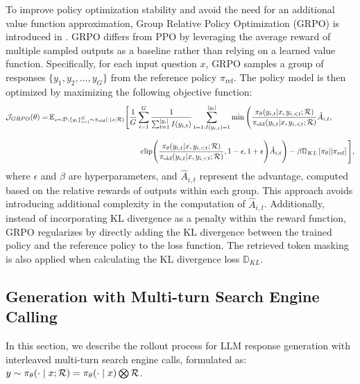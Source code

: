 To improve policy optimization stability and avoid the need for an additional value function approximation, Group Relative Policy Optimization (GRPO) is introduced in \cite{shao2024deepseekmath}. GRPO differs from PPO by leveraging the average reward of multiple sampled outputs as a baseline rather than relying on a learned value function. Specifically, for each input question \( x \), GRPO samples a group of responses \( \{ y_1, y_2, \dots, y_G \} \) from the reference policy \( \pi_{\text{ref}} \). The policy model is then optimized by maximizing the following objective function:
{\scriptsize
\begin{align}\label{eq:grpo}
\mathcal{J}_{GRPO}(\theta) = \, & 
\mathbb{E}_{x \sim \mathcal{D}, \{ y_i \}_{i=1}^{G} \sim \pi_{\text{old}}( \cdot| x; \se)}
\Bigg[
\frac{1}{G} \sum_{i=1}^{G} \frac{1}{\sum_{t=1}^{|y_i|}  I(y_{i,t})} \sum_{t=1: I(y_{i,t})=1}^{|y_i|} 
\min \Bigg( 
\frac{\pi_{\theta}(y_{i,t} | x, y_{i,<t}; \se)}{\pi_{\text{old}}(y_{i,t} | x, y_{i,<t}; \se)} \hat{A}_{i,t}, 
\nonumber \\[8pt] 
& \hspace{120pt} \text{clip} \Bigg( \frac{\pi_{\theta}(y_{i,t} | x, y_{i,<t}; \se)}{\pi_{\text{old}}(y_{i,t} | x, y_{i,<t}; \se)}, 1 - \epsilon, 1 + \epsilon \Bigg) \hat{A}_{i,t} 
\Bigg)
- \beta \mathbb{D}_{KL} \left[ \pi_{\theta} || \pi_{\text{ref}} \right]
\Bigg],
\end{align}
}
where \( \epsilon \) and \( \beta \) are hyperparameters, and \( \hat{A}_{i,t} \) represent the advantage, computed based on the relative rewards of outputs within each group. 
This approach avoids introducing additional complexity in the computation of \( \hat{A}_{i,t} \).
Additionally, instead of incorporating KL divergence as a penalty within the reward function, GRPO regularizes by directly adding the KL divergence between the trained policy and the reference policy to the loss function. 
The retrieved token masking is also applied when calculating the KL divergence loss $\mathbb{D}_{KL}$.


\subsection{Generation with Multi-turn Search Engine Calling}\label{sec:rollout}

In this section, we describe the rollout process for LLM response generation with interleaved multi-turn search engine calls, formulated as: $y\sim \pi_{\theta}(\cdot \mid x; \mathcal{R}) = \pi_{\theta}(\cdot \mid x) \bigotimes \mathcal{R}$.

